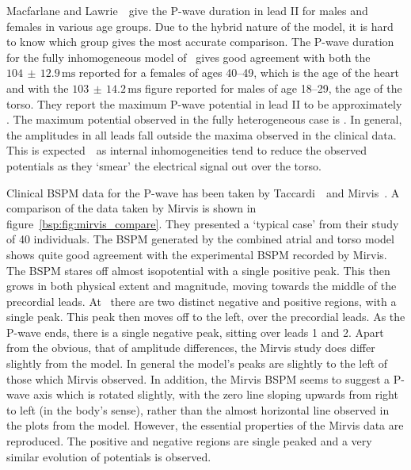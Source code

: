 Macfarlane and Lawrie~\cite{MacFarlane1989}\ give the P-wave duration in
lead II for males and females in various age groups.
Due to the hybrid nature of the model, it is hard to know which group gives the
most accurate comparison.
The P-wave duration for the fully inhomogeneous model of \ gives good
agreement with both the $104\,\pm\,12.9\,\text{ms}$ reported for a females of
ages 40--49, which is the age of the heart and with the
$103\,\pm\,14.2\,\text{ms}$ figure reported for males of age 18--29, the age of
the torso.
They report the maximum P-wave potential in lead II to be approximately
.
The maximum potential observed in the fully heterogeneous case is .
In general, the amplitudes in all leads fall outside the maxima observed in the
clinical data.
This is expected~\cite{Rudy2006,Gulrajani1983,Gulrajani1989,Klepfer1997}\ as internal
inhomogeneities tend to reduce the observed potentials as they `smear' the
electrical signal out over the torso.

Clinical BSPM data for the P-wave has been taken by
Taccardi~\cite{Taccardi1966}\ and Mirvis~\cite{Mirvis1980}.
A comparison of the data taken by Mirvis is shown in
figure~\ref{bsp:fig:mirvis_compare}.
They presented a `typical case' from their study of 40 individuals.
The BSPM generated by the combined atrial and torso model shows quite good
agreement with the experimental BSPM recorded by Mirvis.
The BSPM stares off almost isopotential with a single positive peak.
This then grows in both physical extent and magnitude, moving towards the middle
of the precordial leads.
At \ there are two distinct negative and positive regions, with a single
peak.
This peak then moves off to the left, over the precordial leads.
As the P-wave ends, there is a single negative peak, sitting over leads 1 and 2.
Apart from the obvious, that of amplitude differences, the Mirvis study does
differ slightly from the model.
In general the model's peaks are slightly to the left of those which Mirvis
observed.
In addition, the Mirvis BSPM seems to suggest a P-wave axis which is rotated
slightly, with the zero line sloping upwards from right to left (in the body's
sense), rather than the almost horizontal line observed in the plots from the
model.
However, the essential properties of the Mirvis data are reproduced.
The positive and negative regions are single peaked and a very similar evolution
of potentials is observed.

